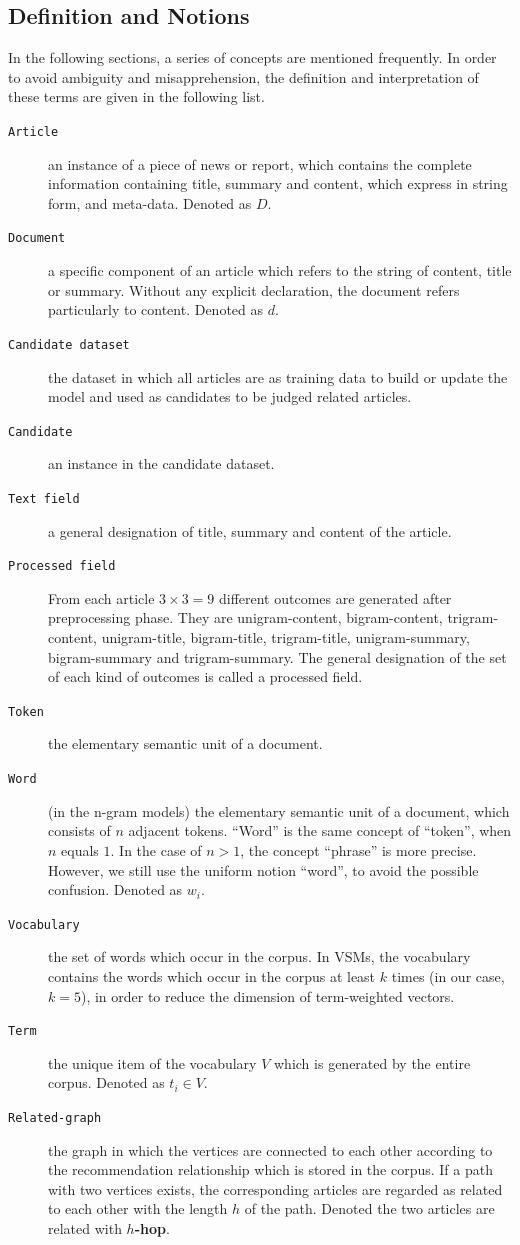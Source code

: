 \bigbreak

\subsection{Definition and Notions}
\label{sec:4.2}

In the following sections, a series of concepts are mentioned frequently. In order to avoid ambiguity and misapprehension, the definition and interpretation of these terms are given in the following list.

\begin{description}
\item[\texttt{Article}] an instance of a piece of news or report, which contains the complete information containing title, summary and content, which express in string form, and meta-data. Denoted as $D$.
\item[\texttt{Document}] a specific component of an article which refers to the string of content, title or summary. Without any explicit declaration, the document refers particularly to content. Denoted as $d$.
\item[\texttt{Candidate dataset}] the dataset in which all articles are as training data to build or update the model and used as candidates to be judged related articles. 
\item[\texttt{Candidate}] an instance in the candidate dataset.
\item[\texttt{Text field}] a general designation of title, summary and content of the article. 
\item[\texttt{Processed field}] From each article $3\times3=9$ different outcomes are generated after preprocessing phase. They are unigram-content, bigram-content, trigram-content, unigram-title, bigram-title, trigram-title, unigram-summary, bigram-summary and trigram-summary. The general designation of the set of each kind of outcomes is called a processed field. 
\item[\texttt{Token}] the elementary semantic unit of a document.
\item[\texttt{Word}] (in the n-gram models) the elementary semantic unit of a document, which consists of $n$ adjacent tokens. ``Word'' is the same concept of ``token'', when $n$ equals $1$. In the case of $n > 1$, the concept ``phrase'' is more precise. However, we still use the uniform notion ``word'', to avoid the possible confusion. Denoted as $w_i$. 
\item[\texttt{Vocabulary}] the set of words which occur in the corpus. In VSMs, the vocabulary contains the words which occur in the corpus at least $k$ times (in our case, $k=5$), in order to reduce the dimension of term-weighted vectors. 
\item[\texttt{Term}] the unique item of the vocabulary $V$ which is generated by the entire corpus. Denoted as $t_i \in V$. 
\item[\texttt{Related-graph}] the graph in which the vertices are connected to each other according to the recommendation relationship which is stored in the corpus. If a path with two vertices exists, the corresponding articles are regarded as related to each other with the length $h$ of the path. Denoted the two articles are related with \textbf{$h$-hop}.


\end{description}
